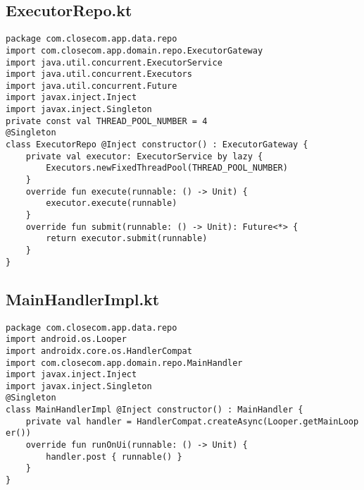 \documentclass[listing]{espd}
\begin{document}
\subsection{ExecutorRepo.kt}
\begin{verbatim}
package com.closecom.app.data.repo
import com.closecom.app.domain.repo.ExecutorGateway
import java.util.concurrent.ExecutorService
import java.util.concurrent.Executors
import java.util.concurrent.Future
import javax.inject.Inject
import javax.inject.Singleton
private const val THREAD_POOL_NUMBER = 4
@Singleton
class ExecutorRepo @Inject constructor() : ExecutorGateway {
    private val executor: ExecutorService by lazy {
        Executors.newFixedThreadPool(THREAD_POOL_NUMBER)
    }
    override fun execute(runnable: () -> Unit) {
        executor.execute(runnable)
    }
    override fun submit(runnable: () -> Unit): Future<*> {
        return executor.submit(runnable)
    }
}
\end{verbatim}

\subsection{MainHandlerImpl.kt}
\begin{verbatim}
package com.closecom.app.data.repo
import android.os.Looper
import androidx.core.os.HandlerCompat
import com.closecom.app.domain.repo.MainHandler
import javax.inject.Inject
import javax.inject.Singleton
@Singleton
class MainHandlerImpl @Inject constructor() : MainHandler {
    private val handler = HandlerCompat.createAsync(Looper.getMainLoop
er())
    override fun runOnUi(runnable: () -> Unit) {
        handler.post { runnable() }
    }
}
\end{verbatim}
\end{document}
